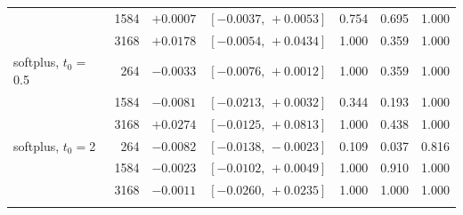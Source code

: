 {\begin{tabular}{@{}lrrcrrr@{}}
 & 1584 & $+0.0007$ & $[-0.0037,\,+0.0053]$ & 0.754 & 0.695 & 1.000 \\
 & 3168 & $+0.0178$ & $[-0.0054,\,+0.0434]$ & 1.000 & 0.359 & 1.000 \\
\addlinespace[2pt]
softplus, $t_0{=}$0.5 & 264 & $-0.0033$ & $[-0.0076,\,+0.0012]$ & 1.000 & 0.359 & 1.000 \\
 & 1584 & $-0.0081$ & $[-0.0213,\,+0.0032]$ & 0.344 & 0.193 & 1.000 \\
 & 3168 & $+0.0274$ & $[-0.0125,\,+0.0813]$ & 1.000 & 0.438 & 1.000 \\
\addlinespace[2pt]
softplus, $t_0{=}$2 & 264 & $-0.0082$ & $[-0.0138,\,-0.0023]$ & 0.109 & 0.037 & 0.816 \\
 & 1584 & $-0.0023$ & $[-0.0102,\,+0.0049]$ & 1.000 & 0.910 & 1.000 \\
 & 3168 & $-0.0011$ & $[-0.0260,\,+0.0235]$ & 1.000 & 1.000 & 1.000 \\
\addlinespace[2pt]
\bottomrule
\end{tabular}
}
